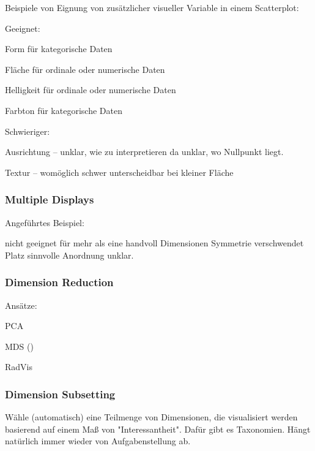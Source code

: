 \documentclass[10pt]{article} %
\begin{document}
Beispiele von Eignung von zusätzlicher visueller Variable in einem
Scatterplot:

Geeignet:
\begin{cptitemize} 
 	 \item Form für kategorische Daten
 	 \item Fläche für ordinale oder numerische Daten
 	 \item Helligkeit für ordinale oder numerische Daten
 	 \item Farbton für kategorische Daten
\end{cptitemize} 

Schwieriger:
\begin{cptitemize} 
 	 \item Ausrichtung -- unklar, wie zu interpretieren da unklar, wo
 	 Nullpunkt liegt.
 	 \item Textur -- womöglich schwer unterscheidbar bei kleiner Fläche
\end{cptitemize} 


\subsubsection{Multiple Displays}

Angeführtes Beispiel: 
\begin{cptitemize} 
  	 \disadvantageit nicht geeignet für mehr als eine handvoll
  	 Dimensionen
  	 \disadvantageit Symmetrie verschwendet Platz
  	 \disadvantageit sinnvolle Anordnung unklar.
 \end{cptitemize}  



\subsubsection{Dimension Reduction}

Ansätze:
\begin{cptitemize} 
 	 \item PCA
 	 \item MDS () 
 	 \item RadVis
\end{cptitemize} 

\subsubsection{Dimension Subsetting}

Wähle (automatisch) eine Teilmenge von Dimensionen, die visualisiert
werden basierend auf einem Maß von "Interessantheit". Dafür gibt es
Taxonomien. Hängt natürlich immer wieder von Aufgabenstellung ab.
\end{document}
